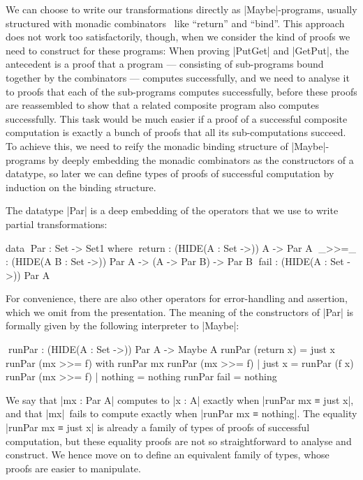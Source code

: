 \documentclass[fleqn]{llncs}
\begin{document}
We can choose to write our transformations directly as |Maybe|-programs, usually structured with monadic combinators~\cite{Moggi-monads,Wadler-essence} like ``return'' and ``bind''.
This approach does not work too satisfactorily, though, when we consider the kind of proofs we need to construct for these programs:
When proving |PutGet| and |GetPut|, the antecedent is a proof that a program --- consisting of sub-programs bound together by the combinators --- computes successfully, and we need to analyse it to proofs that each of the sub-programs computes successfully, before these proofs are reassembled to show that a related composite program also computes successfully.
This task would be much easier if a proof of a successful composite computation is exactly a bunch of proofs that all its sub-computations succeed.
To achieve this, we need to reify the monadic binding structure of |Maybe|-programs by deeply embedding the monadic combinators as the constructors of a datatype, so later we can define types of proofs of successful computation by induction on the binding structure.

The datatype |Par| is a deep embedding of the operators that we use to write partial transformations:
\begin{code}
data ^^^Par : Set -> Set1 where
  ^^^return        : (HIDE({A : Set} ->))    A -> Par A
  ^^^_>>=_         : (HIDE({A B : Set} ->))  Par A -> (A -> Par B) -> Par B
  ^^^fail          : (HIDE({A : Set} ->))    Par A
\end{code}
For convenience, there are also other operators for error-handling and assertion, which we omit from the presentation.
The meaning of the constructors of |Par| is formally given by the following interpreter to |Maybe|:
\begin{code}
^^^runPar : (HIDE({A : Set} ->)) Par A -> Maybe A
runPar (return x) = just x
runPar (mx >>= f)  with runPar mx
runPar (mx >>= f)  | just x   = runPar (f x)
runPar (mx >>= f)  | nothing  = nothing
runPar fail = nothing
\end{code}
We say that |mx : Par A| computes to |x : A| exactly when |runPar mx ≡ just x|, and that |mx|~fails to compute exactly when |runPar mx ≡ nothing|.
The equality |runPar mx ≡ just x| is already a family of types of proofs of successful computation, but these equality proofs are not so straightforward to analyse and construct.
We hence move on to define an equivalent family of types, whose proofs are easier to manipulate.
\end{document}
